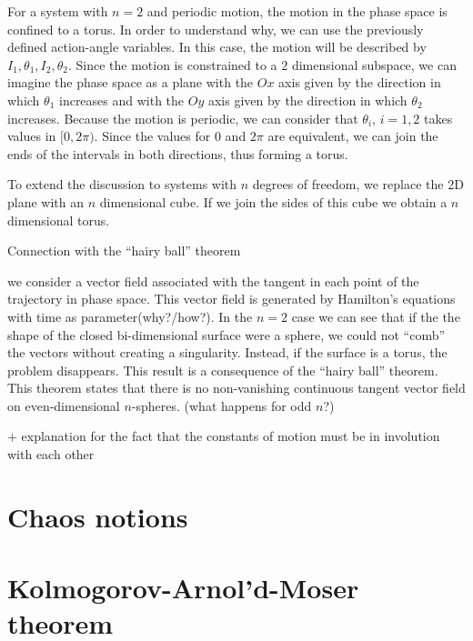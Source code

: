 \documentclass[../thesis.tex]{subfiles}
\begin{document}
For a system with \(n=2\) and periodic motion, the motion in the phase space is confined
to a torus. In order to understand why, we can use the previously defined action-angle variables.
In this case, the motion will be described by \(I_1, \theta_1, I_2, \theta_2\).
Since the motion is constrained to a \(2\) dimensional subspace, we can imagine the phase space
as a plane with the \(Ox\) axis given by the direction in which \(\theta_1\) increases and
with the \(Oy\) axis given by the direction in which \(\theta_2\) increases. Because the motion
is periodic, we can consider that \(\theta_i\), \(i=1,2\) takes values in \([0,2\pi)\).
Since the values for \(0\) and \(2\pi \) are equivalent, we can join the ends of the
intervals in both directions, thus forming a torus.

To extend the discussion to systems with \(n\) degrees of freedom,
we replace the 2D plane with an \(n\) dimensional cube. If we join the sides of
this cube we obtain a \(n\) dimensional torus.

{\color{red}Connection with the ``hairy ball'' theorem

we consider a vector field associated with the tangent in each point of the trajectory
in phase space. This vector field is generated by Hamilton's equations with time
as parameter{\color{red}(why?/how?)}.
In the \(n=2\) case we can see that if the the shape of the closed bi-dimensional
surface were a sphere, we could not ``comb'' the vectors without creating a singularity.
Instead, if the surface is a torus, the problem disappears. This result is a consequence of
the ``hairy ball'' theorem. This theorem states that there is no non-vanishing continuous
tangent vector field on even-dimensional $n$-spheres. (what happens for odd $n$?)
}

{\color{red}+ explanation for the fact that the constants of motion must be
in involution with each other}


\section{Chaos notions}



\section{Kolmogorov-Arnol'd-Moser theorem}
\end{document}
